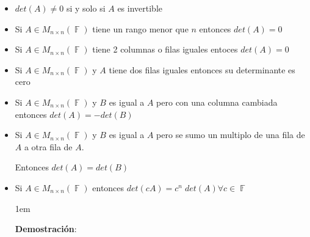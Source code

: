 \documentclass[12pt, fleqn]{report}                             %
\newenvironment{SmallIndentation}[1][0.75em]                    %
        {\begin{adjustwidth}{#1}{}\begin{footnotesize}}             %
        {\end{footnotesize}\end{adjustwidth}}                       %
\theoremstyle{break}                                            %
\DeclareMathOperator \GenericField {\mathbb{F}}                 %
\begin{document}
                \begin{itemize}

                    \item
                        $det(A) \neq 0$ si y solo si $A$ es invertible

                    \item
                        Si $A \in M_{n \times n}(\GenericField)$ tiene un rango menor que $n$
                        entonces $det(A) = 0$

                    \item
                        Si $A \in M_{n \times n}(\GenericField)$ tiene 2 columnas o filas iguales entoces
                        $det(A) = 0$

                    \item
                        Si $A \in M_{n \times n}(\GenericField)$ y $A$ tiene dos filas iguales
                        entonces su determinante es cero

                    \item
                        Si $A \in M_{n \times n}(\GenericField)$ y $B$ es igual a $A$ pero con una
                        columna cambiada entonces $det(A) = - det(B)$

                    \item
                        Si $A \in M_{n \times n}(\GenericField)$ y $B$ es igual a $A$ pero se sumo un
                        multiplo de una fila de $A$ a otra fila de $A$.

                        Entonces $det(A) = det(B)$

                    \item
                        
                        Si $A \in M_{n \times n}(\GenericField)$ entonces $det(cA) = c^n \; det(A) \forall c \in \GenericField$
                        \begin{SmallIndentation}[1em]
                            \textbf{Demostración}:
                            

\end{SmallIndentation}
\end{itemize}
\end{document}
